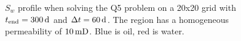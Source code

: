 \begin{figure}[ht]
\centering
{}
\caption{$S_w$ profile when solving the Q5 problem on a 20x20 grid with $t_{\text{end}} = \unit[300]{d}$ and $\Delta t = \unit[60]{d}$. The region has a homogeneous permeability of $\unit[10]{mD}$. Blue is oil, red is water.}
\label{fig:sat_hist_hom}
\end{figure}